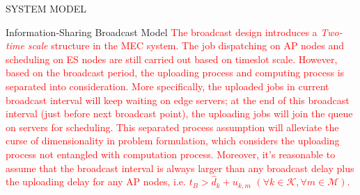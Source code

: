 \documentclass[10pt, conference, letterpaper]{IEEEtran}
\newcommand{\apSet}{\mathcal{K}}
\newcommand{\esSet}{\mathcal{M}}
\begin{document}
\begin{section}{SYSTEM MODEL}
\begin{subsection}{Information-Sharing Broadcast Model}
            \textcolor{red}{The broadcast design introduces a \emph{Two-time scale} structure in the MEC system. The job dispatching on AP nodes and scheduling on ES nodes are still carried out based on timeslot scale. However, based on the broadcast period, the uploading process and computing process is separated into consideration.
            More specifically, the uploaded jobs in current broadcast interval will keep waiting on edge servers; at the end of this broadcast interval (just before next broadcast point), the uploading jobs will join the queue on servers for scheduling. This separated process assumption will alleviate the curse of dimensionality in problem formulation, which considers the uploading process not entangled with computation process.
            Moreover, it's reasonable to assume that the broadcast interval is always larger than any broadcast delay plus the uploading delay for any AP nodes, i.e. $t_B > \hat{d}_{k} + u_{k,m}$ $(\forall k\in\apSet, \forall m\in\esSet)$.}
        \end{subsection}
    \end{section}
\end{document}
